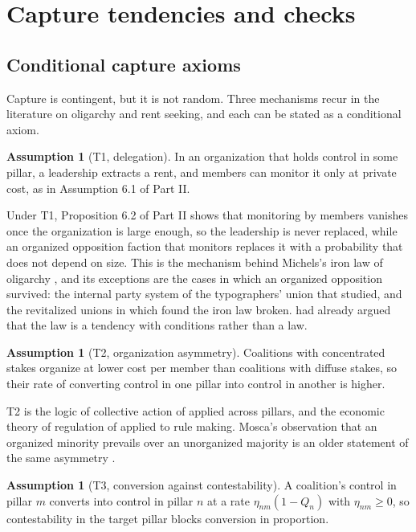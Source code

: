 \documentclass[11pt,letterpaper]{article}
\theoremstyle{definition}
\newtheorem{assumption}[theorem]{Assumption}
\theoremstyle{remark}
\begin{document}
\section{Capture tendencies and checks}
\label{sec:tendencies}

\subsection{Conditional capture axioms}

Capture is contingent, but it is not random. Three mechanisms recur in the literature on oligarchy and rent seeking, and each can be stated as a conditional axiom.

\begin{assumption}[T1, delegation]
\label{ass:formalized-state:T1}
In an organization that holds control in some pillar, a leadership extracts a rent, and members can monitor it only at private cost, as in Assumption 6.1 of Part II.
\end{assumption}

Under T1, Proposition 6.2 of Part II shows that monitoring by members vanishes once the organization is large enough, so the leadership is never replaced, while an organized opposition faction that monitors replaces it with a probability that does not depend on size. This is the mechanism behind Michels's iron law of oligarchy \citep{michels1915}, and its exceptions are the cases in which an organized opposition survived: the internal party system of the typographers' union that \citet{lipset1956} studied, and the revitalized unions in which \citet{voss2000} found the iron law broken.  had already argued that the law is a tendency with conditions rather than a law.

\begin{assumption}[T2, organization asymmetry]
\label{ass:formalized-state:T2}
Coalitions with concentrated stakes organize at lower cost per member than coalitions with diffuse stakes, so their rate of converting control in one pillar into control in another is higher.
\end{assumption}

T2 is the logic of collective action of \citet{olson1965} applied across pillars, and the economic theory of regulation of \citet{stigler1971} applied to rule making. Mosca's observation that an organized minority prevails over an unorganized majority is an older statement of the same asymmetry \citep{mosca1939}.

\begin{assumption}[T3, conversion against contestability]
\label{ass:formalized-state:T3}
A coalition's control in pillar $m$ converts into control in pillar $n$ at a rate $\eta_{nm}(1-Q_n)$ with $\eta_{nm}\ge0$, so contestability in the target pillar blocks conversion in proportion.
\end{assumption}
\end{document}

